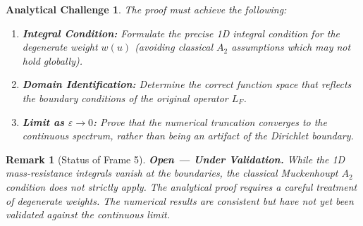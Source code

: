 \documentclass[12pt,a4paper]{article}
\newtheorem{remark}{Remark}
\newtheorem{challenge}{Analytical Challenge}
\begin{document}
\begin{challenge}
The proof must achieve the following:
\begin{enumerate}
    \item \textbf{Integral Condition:} Formulate the precise 1D integral condition for the degenerate weight \(w(u)\) (avoiding classical \(A_2\) assumptions which may not hold globally).
    \item \textbf{Domain Identification:} Determine the correct function space that reflects the boundary conditions of the original operator \(L_F\).
    \item \textbf{Limit as \(\varepsilon \to 0\):} Prove that the numerical truncation converges to the continuous spectrum, rather than being an artifact of the Dirichlet boundary.
\end{enumerate}
\end{challenge}

\begin{remark}[Status of Frame 5]
\textbf{Open — Under Validation.} While the 1D mass-resistance integrals vanish at the boundaries, the classical Muckenhoupt \(A_2\) condition does not strictly apply. The analytical proof requires a careful treatment of degenerate weights. The numerical results are consistent but have not yet been validated against the continuous limit.
\end{remark}
\end{document}
